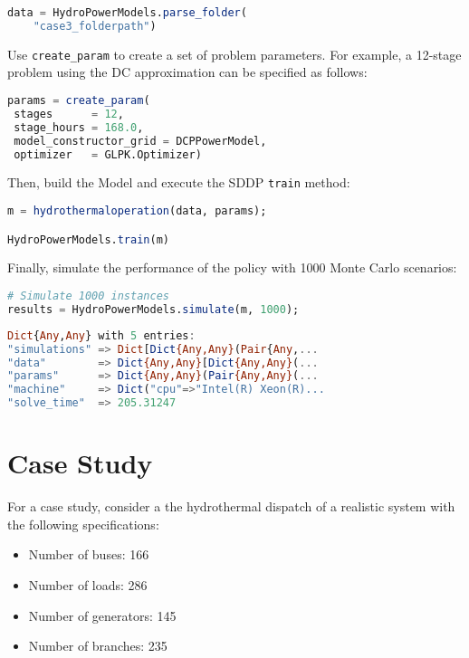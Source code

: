 \documentclass{juliacon}
\begin{document}
\begin{lstlisting}[language = Julia]
data = HydroPowerModels.parse_folder(
    "case3_folderpath")
\end{lstlisting}

Use \texttt{create\_param} to create a set of problem parameters. For example, a 12-stage problem using the DC approximation can be specified as follows:
\begin{lstlisting}[language = Julia]
params = create_param( 
 stages      = 12, 
 stage_hours = 168.0,
 model_constructor_grid = DCPPowerModel,
 optimizer   = GLPK.Optimizer)
\end{lstlisting}
    
Then, build the Model and execute the SDDP \texttt{train} method:

\begin{lstlisting}[language = Julia]
m = hydrothermaloperation(data, params);

HydroPowerModels.train(m)
\end{lstlisting}

Finally, simulate the performance of the policy with 1000 Monte Carlo scenarios:

\begin{lstlisting}[language = Julia]
# Simulate 1000 instances
results = HydroPowerModels.simulate(m, 1000);
\end{lstlisting}
\begin{lstlisting}[language = Julia]
 Dict{Any,Any} with 5 entries:
"simulations" => Dict[Dict{Any,Any}(Pair{Any,...
"data"        => Dict{Any,Any}[Dict{Any,Any}(...
"params"      => Dict{Any,Any}(Pair{Any,Any}(...
"machine"     => Dict("cpu"=>"Intel(R) Xeon(R)...
"solve_time"  => 205.31247
\end{lstlisting}

\section{Case Study}
\label{sec:case}

For a case study, consider a the hydrothermal dispatch of a realistic system with the following specifications:

\begin{itemize}
    \item Number of buses: 166
    \item Number of loads: 286
    \item Number of generators: 145
    \item Number of branches: 235
\end{itemize}
\end{document}
